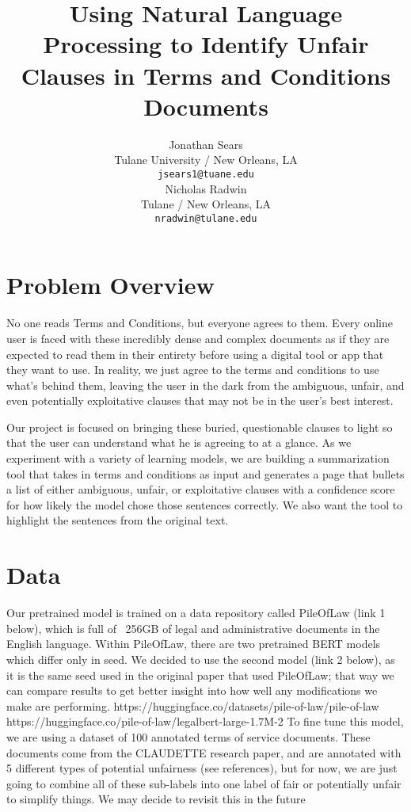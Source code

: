 \documentclass[11pt,a4paper]{article}
\title{Using Natural Language Processing to Identify Unfair Clauses in Terms and Conditions Documents}
\author{Jonathan Sears\\
  Tulane University / New Orleans, LA \\
  \texttt{jsears1@tuane.edu} \\\And
  Nicholas Radwin \\
  Tulane  / New Orleans, LA\\
  \texttt{nradwin@tulane.edu} \\}
\date{}
\begin{document}
\maketitle



\section{Problem Overview}

No one reads Terms and Conditions, but everyone agrees to them. Every online user is faced with these incredibly dense and complex documents as if they are expected to read them in their entirety before using a digital tool or app that they want to use. In reality, we just agree to the terms and conditions to use what's behind them, leaving the user in the dark from the ambiguous, unfair, and even potentially exploitative clauses that may not be in the user's best interest.

Our project is focused on bringing these buried, questionable clauses to light so that the user can understand what he is agreeing to at a glance. As we experiment with a variety of learning models, we are building a summarization tool that takes in terms and conditions as input and generates a page that bullets a list of either ambiguous, unfair, or exploitative clauses with a confidence score for how likely the model chose those sentences correctly. We also want the tool to highlight the sentences from the original text.

\section{Data}

Our pretrained model is trained on a data repository called PileOfLaw (link 1 below), which is full of ~256GB of legal and administrative documents in the English language.
Within PileOfLaw, there are two pretrained BERT models which differ only in seed. We decided to use the second model (link 2 below), as it is the same seed used in the original paper that used PileOfLaw; that way we can compare results to get better insight into how well any modifications we make are performing.
https://huggingface.co/datasets/pile-of-law/pile-of-law
https://huggingface.co/pile-of-law/legalbert-large-1.7M-2
To fine tune this model, we are using a dataset of 100 annotated terms of service documents. These documents come from the CLAUDETTE research paper, and are annotated with
5 different types of potential unfairness (see references), but for now, we are just going to combine all of these sub-labels into one label of fair or potentially unfair to simplify things. We may decide to revisit this in the future
\end{document}

